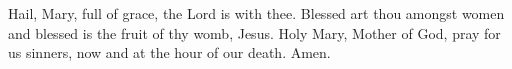 \begin{enpars}\noindent
Hail, Mary, full of grace,
the Lord is with thee.
Blessed art thou amongst women
and blessed is the fruit of thy womb, Jesus.
Holy Mary, Mother of God,
pray for us sinners,
now and at the hour of our death. 
Amen.
\end{enpars}